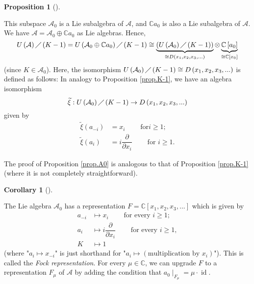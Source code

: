 \documentclass
[numbers=enddot,12pt,final,onecolumn,german,notitlepage]{scrartcl}%
\theoremstyle{definition}
\newtheorem{prop}[theo]{Proposition}
\newenvironment{proposition}[1][]
{\begin{prop}[#1]\begin{leftbar}}
{\end{leftbar}\end{prop}}
\newtheorem{coro}[theo]{Corollary}
\newenvironment{corollary}[1][]
{\begin{coro}[#1]\begin{leftbar}}
{\end{leftbar}\end{coro}}
\begin{document}
\begin{proposition}
\label{prop.A0}This subspace $\mathcal{A}_{0}$ is a Lie subalgebra of
$\mathcal{A}$, and $\mathbb{C}a_{0}$ is also a Lie subalgebra of $\mathcal{A}%
$. We have $\mathcal{A}=\mathcal{A}_{0}\oplus\mathbb{C}a_{0}$ as Lie algebras.
Hence,%
\[
U\left(  \mathcal{A}\right)  \diagup\left(  K-1\right)  =U\left(
\mathcal{A}_{0}\oplus\mathbb{C}a_{0}\right)  \diagup\left(  K-1\right)
\cong\underbrace{\left(  U\left(  \mathcal{A}_{0}\right)  \diagup\left(
K-1\right)  \right)  }_{\cong D\left(  x_{1},x_{2},x_{3},...\right)  }%
\otimes\underbrace{\mathbb{C}\left[  a_{0}\right]  }_{\cong\mathbb{C}\left[
x_{0}\right]  }%
\]
(since $K\in\mathcal{A}_{0}$). Here, the isomorphism $U\left(  \mathcal{A}%
_{0}\right)  \diagup\left(  K-1\right)  \cong D\left(  x_{1},x_{2}%
,x_{3},...\right)  $ is defined as follows: In analogy to Proposition
\ref{prop.K-1}, we have an algebra isomorphism%
\[
\widetilde{\xi}:U\left(  \mathcal{A}_{0}\right)  \diagup\left(  K-1\right)
\rightarrow D\left(  x_{1},x_{2},x_{3},...\right)
\]
given by%
\begin{align*}
\widetilde{\xi}\left(  a_{-i}\right)   &  =x_{i}\ \ \ \ \ \ \ \ \ \ \text{for
}i\geq1;\\
\widetilde{\xi}\left(  a_{i}\right)   &  =i\dfrac{\partial}{\partial x_{i}%
}\ \ \ \ \ \ \ \ \ \ \text{for }i\geq1.
\end{align*}

\end{proposition}

The proof of Proposition \ref{prop.A0} is analogous to that of Proposition
\ref{prop.K-1} (where it is not completely straightforward).

\begin{corollary}
The Lie algebra $\mathcal{A}_{0}$ has a representation $F=\mathbb{C}\left[
x_{1},x_{2},x_{3},...\right]  $ which is given by
\begin{align*}
a_{-i}  &  \mapsto x_{i}\ \ \ \ \ \ \ \ \ \ \text{for every }i\geq1;\\
a_{i}  &  \mapsto i\dfrac{\partial}{\partial x_{i}}%
\ \ \ \ \ \ \ \ \ \ \text{for every }i\geq1,\\
K  &  \mapsto1
\end{align*}
(where "$a_{i}\mapsto x_{-i}$" is just shorthand for "$a_{i}\mapsto\left(
\text{multiplication by }x_{i}\right)  $"). This is called the \textit{Fock
representation}. For every $\mu\in\mathbb{C}$, we can upgrade $F$ to a
representation $F_{\mu}$ of $\mathcal{A}$ by adding the condition that
$a_{0}\mid_{F_{\mu}}=\mu\cdot\operatorname*{id}$.
\end{corollary}
\end{document}
